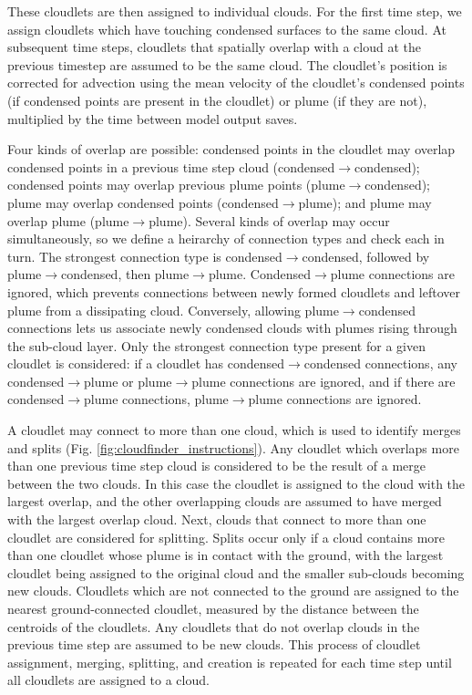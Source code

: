 \documentclass[acp]{copernicus}
\begin{document}
These cloudlets are then assigned to individual clouds.  For the first time 
step, we assign cloudlets which have touching condensed surfaces to the same 
cloud.  At subsequent time steps, cloudlets that spatially overlap with a cloud 
at the previous timestep are assumed to be the same cloud.  The cloudlet's 
position is corrected for advection using the mean velocity of the cloudlet's 
condensed points (if condensed points are present in the cloudlet) or plume 
(if they are not), multiplied by the time between model output saves.

Four kinds of overlap are possible: condensed points in the cloudlet may 
overlap condensed points in a previous time step cloud 
(condensed$\rightarrow$condensed); condensed points may overlap previous plume 
points (plume$\rightarrow$condensed); plume may overlap condensed points 
(condensed$\rightarrow$plume); and plume may overlap plume 
(plume$\rightarrow$plume).  Several kinds of overlap may occur simultaneously, 
so we define a heirarchy of connection types and check each in turn.  The 
strongest connection type is condensed$\rightarrow$condensed, followed by 
plume$\rightarrow$condensed, then plume$\rightarrow$plume.  
Condensed$\rightarrow$plume connections are ignored, which prevents 
connections between newly formed cloudlets and leftover plume from a 
dissipating cloud.  Conversely, allowing plume$\rightarrow$condensed 
connections lets us associate newly condensed clouds with plumes rising through 
the sub-cloud layer.  Only the strongest connection type present for a given 
cloudlet is considered: if a cloudlet has condensed$\rightarrow$condensed 
connections, any condensed$\rightarrow$plume or plume$\rightarrow$plume 
connections are ignored, and if there are condensed$\rightarrow$plume 
connections, plume$\rightarrow$plume connections are ignored.  

A cloudlet may connect to more than one cloud, which is used to identify 
merges and splits (Fig. \ref{fig:cloudfinder_instructions}).  Any cloudlet 
which overlaps more than one previous time step cloud is considered to be the 
result of a merge between the two clouds.  In this case the cloudlet is 
assigned to the cloud with the largest overlap, and the other overlapping 
clouds are assumed to have merged with the largest overlap cloud.  Next, 
clouds that connect to more than one cloudlet are considered for splitting.  
Splits occur only if a cloud contains more than one cloudlet whose plume is in 
contact with the ground, with the largest cloudlet being assigned to the 
original cloud and the smaller sub-clouds becoming new clouds. Cloudlets which 
are not connected to the ground are assigned to the nearest ground-connected 
cloudlet, measured by the distance between the centroids of the cloudlets.  
Any cloudlets that do not overlap clouds in the previous time step are assumed 
to be new clouds.  This process of cloudlet assignment, merging, splitting, and 
creation is repeated for each time step until all cloudlets are assigned to a 
cloud.
  
\end{document}
